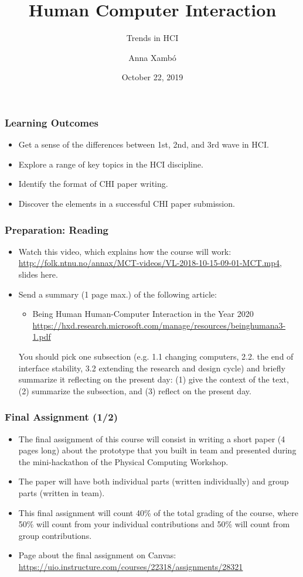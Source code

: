 \documentclass[screen, aspectratio=169]{beamer}
\title[HCI-intro]{Human Computer Interaction}
\subtitle{Trends in HCI}
\author[A. Xamb{\'o}]{Anna Xamb{\'o}}
\institute[NTNU]{Department of Music, NTNU}
\date{October 22, 2019}
\begin{document}
\begin{frame}
  \titlepage
\end{frame}


\begin{frame}
\frametitle{Learning Outcomes}
\begin{itemize}
\item Get a sense of the differences between 1st, 2nd, and 3rd wave in HCI.
\item Explore a range of key topics in the HCI discipline.
\item Identify the format of CHI paper writing.
\item Discover the elements in a successful CHI paper submission.
\end{itemize}
\end{frame}
%
\begin{frame}
\frametitle{Preparation: Reading}
\begin{itemize}
\item Watch this video, which explains how the course will work: \url{http://folk.ntnu.no/annax/MCT-videos/VL-2018-10-15-09-01-MCT.mp4}, slides here.
\item Send a summary (1 page max.) of the following article:
\begin{itemize}
\item Being Human Human-Computer Interaction in the Year 2020 \cite{Harper.et.al.2008.being}\\
\url{https://hxd.research.microsoft.com/manage/resources/beinghumana3-1.pdf} 
\end{itemize}
You should pick one subsection (e.g. 1.1 changing computers, 2.2. the end of interface stability, 3.2 extending the research and design cycle) and briefly summarize it reflecting on the present day: (1) give the context of the text,
(2) summarize the subsection, and (3) reflect on the present day.
\end{itemize}
\end{frame}
%
\begin{frame}
\frametitle{Final Assignment (1/2)}
{\small
\begin{itemize}
\item The final assignment of this course will consist in writing a short paper (4 pages long) about the prototype that you built in team and presented during the mini-hackathon of the Physical Computing Workshop.
\item The paper will have both individual parts (written individually) and group parts (written in team). 
\item This final assignment will count 40\% of the total grading of the course, where 50\% will count from your individual contributions and 50\% will count from group contributions.
\item Page about the final assignment on Canvas: \url{https://uio.instructure.com/courses/22318/assignments/28321}
\end{itemize}
}
\end{frame}
\end{document}
